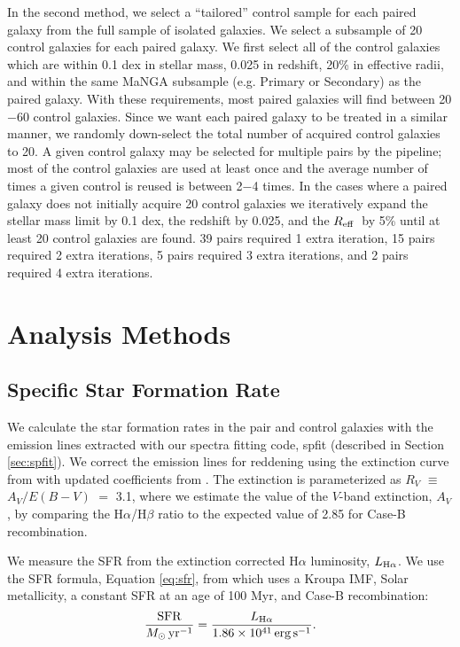 \documentclass[apj,twocolumn]{emulateapj}
\newcommand{\reff}{$R_{\rm eff}$}
\begin{document}
\begin{CJK*}{UTF8}{gbsn}
In the second method, we select a ``tailored'' control sample for each paired galaxy from the full sample of isolated galaxies. We select a subsample of 20 control galaxies for each paired galaxy. We first select all of the control galaxies which are within 0.1 dex in stellar mass, 0.025 in redshift, 20\% in effective radii, and within the same MaNGA subsample (e.g. Primary or Secondary) as the paired galaxy. With these requirements, most paired galaxies will find between 20$-$60 control galaxies. Since we want each paired galaxy to be treated in a similar manner, we randomly down-select the total number of acquired control galaxies to 20. A given control galaxy may be selected for multiple pairs by the pipeline; most of the control galaxies are used at least once and the average number of times a given control is reused is between 2$-$4 times. In the cases where a paired galaxy does not initially acquire 20 control galaxies we iteratively expand the stellar mass limit by 0.1 dex, the redshift by 0.025, and the \reff\ by 5\% until at least 20 control galaxies are found. 39 pairs required 1 extra iteration, 15 pairs required 2 extra iterations, 5 pairs required 3 extra iterations, and 2 pairs required 4 extra iterations. 

\section{Analysis Methods}\label{sec:analysis}

\subsection{Specific Star Formation Rate}
We calculate the star formation rates in the pair and control galaxies with the emission lines extracted with our spectra fitting code, {\sc spfit} (described in Section \ref{sec:spfit}). We correct the emission lines for reddening using the extinction curve from \citet{Cardelli:1989} with updated coefficients from \citet{ODonnell:1994}. The extinction is parameterized as $R_V$ $\equiv$ $A_V/E(B-V)$ $=$ 3.1, where we estimate the value of the $V$-band extinction, $A_V$, by comparing the H$\alpha$/H$\beta$ ratio to the expected value of 2.85 for Case-B recombination. 

We measure the SFR from the extinction corrected H$\alpha$ luminosity, $L_{{\rm H}\alpha}$. We use the SFR formula, Equation \ref{eq:sfr}, from \citet{Murphy:2011} which uses a Kroupa IMF, Solar metallicity, a constant SFR at an age of 100 Myr, and Case-B recombination: 
\begin{equation}\label{eq:sfr}
\frac{\rm{SFR}}{M_{\odot} \, \rm{yr^{-1}}} = \frac{L_{\rm H\alpha}}{1.86 \times 10^{41}\, \rm{erg\,s}^{-1}}.
\end{equation}


\end{CJK*}
\end{document}
